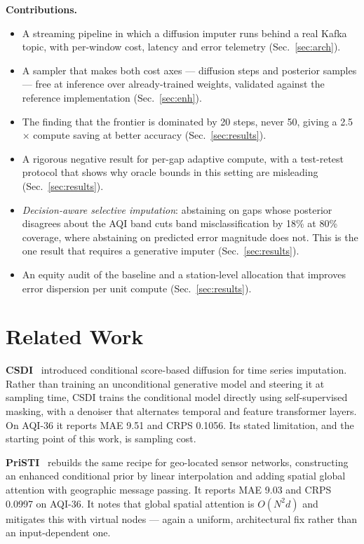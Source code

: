 \documentclass[conference]{IEEEtran}
\begin{document}
\noindent\textbf{Contributions.}
\begin{itemize}
\item A streaming pipeline in which a diffusion imputer runs behind a real Kafka
topic, with per-window cost, latency and error telemetry (Sec.~\ref{sec:arch}).
\item A sampler that makes both cost axes --- diffusion steps and posterior
samples --- free at inference over already-trained weights, validated against
the reference implementation (Sec.~\ref{sec:enh}).
\item The finding that the frontier is dominated by 20 steps, never 50, giving
a 2.5$\times$ compute saving at better accuracy (Sec.~\ref{sec:results}).
\item A rigorous negative result for per-gap adaptive compute, with a
test-retest protocol that shows why oracle bounds in this setting are
misleading (Sec.~\ref{sec:results}).
\item \emph{Decision-aware selective imputation}: abstaining on gaps whose
posterior disagrees about the AQI band cuts band misclassification by 18\% at
80\% coverage, where abstaining on predicted error magnitude does not. This is
the one result that requires a generative imputer (Sec.~\ref{sec:results}).
\item An equity audit of the baseline and a station-level allocation that
improves error dispersion per unit compute (Sec.~\ref{sec:results}).
\end{itemize}

\section{Related Work}

\textbf{CSDI}~\cite{csdi} introduced conditional score-based diffusion for time
series imputation. Rather than training an unconditional generative model and
steering it at sampling time, CSDI trains the conditional model directly using
self-supervised masking, with a denoiser that alternates temporal and feature
transformer layers. On AQI-36 it reports MAE 9.51 and CRPS 0.1056. Its stated
limitation, and the starting point of this work, is sampling cost.

\textbf{PriSTI}~\cite{pristi} rebuilds the same recipe for geo-located sensor
networks, constructing an enhanced conditional prior by linear interpolation and
adding spatial global attention with geographic message passing. It reports MAE
9.03 and CRPS 0.0997 on AQI-36. It notes that global spatial attention is
$O(N^2d)$ and mitigates this with virtual nodes --- again a uniform,
architectural fix rather than an input-dependent one.
\end{document}
